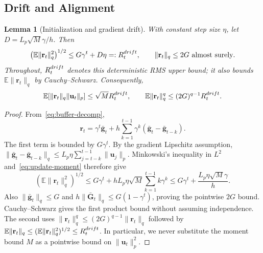 \documentclass[10pt,a4paper]{amsart}
\newtheorem{lemma}{Lemma}
\begin{document}
\subsection{Drift and Alignment}
\begin{lemma}[Initialization and gradient drift]\label{lemma:drift}
With constant step size $\eta$, let $D=L_p\sqrt M\gamma/h$. Then
\begin{equation}\label{eq:drift-rms}
\left(\mathbb E\|\mathbf{r}_t\|_q^2\right)^{1/2}\le G\gamma^t+D\eta=:R_t^{\rm drift},
\qquad \|\mathbf{r}_t\|_q\le2G\ \text{almost surely}.
\end{equation}
Throughout, $R_t^{\rm drift}$ denotes this deterministic RMS upper bound; it also bounds $\mathbb E\|\mathbf r_t\|_q$ by Cauchy--Schwarz. Consequently,
\begin{equation}\label{eq:drift-products}
\mathbb E[\|\mathbf{r}_t\|_q\|\mathbf{u}_t\|_p]\le\sqrt M R_t^{\rm drift},
\qquad \mathbb E\|\mathbf{r}_t\|_q^q\le(2G)^{q-1}R_t^{\rm drift}.
\end{equation}
\end{lemma}
\begin{proof}
From~\eqref{eq:buffer-decomp},
\begin{equation}
\mathbf{r}_t=\gamma^t\bar{\mathbf{g}}_t+h\sum_{k=1}^{t-1}\gamma^k(\bar{\mathbf{g}}_t-\bar{\mathbf{g}}_{t-k}).
\end{equation}
The first term is bounded by $G\gamma^t$. By the gradient Lipschitz assumption,
$\|\bar{\mathbf{g}}_t-\bar{\mathbf{g}}_{t-k}\|_q\le L_p\eta\sum_{j=t-k}^{t-1}\|\mathbf{u}_j\|_p$.
Minkowski's inequality in $L^2$ and~\eqref{eq:update-moment} therefore give
\begin{equation}
(\mathbb E\|\mathbf{r}_t\|_q^2)^{1/2}
\le G\gamma^t+hL_p\eta\sqrt M\sum_{k=1}^{t-1}k\gamma^k
\le G\gamma^t+\frac{L_p\eta\sqrt M\gamma}{h}.
\end{equation}
Also $\|\bar{\mathbf{g}}_t\|_q\le G$ and $h\|\bar{\mathbf{G}}_t\|_q\le G(1-\gamma^t)$, proving the pointwise $2G$ bound. Cauchy--Schwarz gives the first product bound without assuming independence. The second uses $\|\mathbf{r}_t\|_q^q\le(2G)^{q-1}\|\mathbf{r}_t\|_q$ followed by $\mathbb E\|\mathbf r_t\|_q\le(\mathbb E\|\mathbf r_t\|_q^2)^{1/2}\le R_t^{\rm drift}$. In particular, we never substitute the moment bound $M$ as a pointwise bound on $\|\mathbf{u}_t\|_p^2$.
\end{proof}
\end{document}
